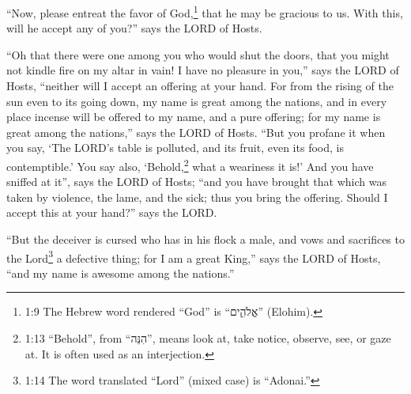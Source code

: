 \myverse{}“Now, please entreat the favor of God,\footnote{1:9 The Hebrew word rendered “God” is “אֱלֹהִ֑ים” (Elohim).} that he may be gracious to us. With this, will he accept any of you?” says the LORD of Hosts.


\myverse{}“Oh that there were one among you who would shut the doors, that you might not kindle fire on my altar in vain! I have no pleasure in you,” says the LORD of Hosts, “neither will I accept an offering at your hand. \myverse{}For from the rising of the sun even to its going down, my name is great among the nations, and in every place incense will be offered to my name, and a pure offering; for my name is great among the nations,” says the LORD of Hosts. \myverse{}“But you profane it when you say, ‘The LORD’s table is polluted, and its fruit, even its food, is contemptible.’ \myverse{}You say also, ‘Behold,\footnote{1:13 “Behold”, from “הִנֵּה”, means look at, take notice, observe, see, or gaze at. It is often used as an interjection.} what a weariness it is!’ And you have sniffed at it”, says the LORD of Hosts; “and you have brought that which was taken by violence, the lame, and the sick; thus you bring the offering. Should I accept this at your hand?” says the LORD.


\myverse{}“But the deceiver is cursed who has in his flock a male, and vows and sacrifices to the Lord\footnote{1:14 The word translated “Lord” (mixed case) is “Adonai.”} a defective thing; for I am a great King,” says the LORD of Hosts, “and my name is awesome among the nations.”


